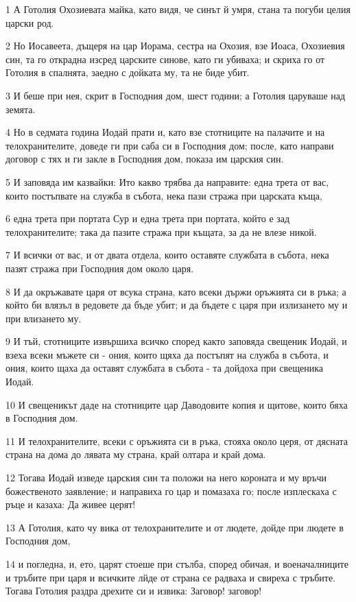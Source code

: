 \par 1 А Готолия Охозиевата майка, като видя, че синът й умря, стана та погуби целия царски род.
\par 2 Но Иосавеета, дъщеря на цар Иорама, сестра на Охозия, взе Иоаса, Охозиевия син, та го открадна изсред царските синове, като ги убиваха; и скриха го от Готолия в спалнята, заедно с дойката му, та не биде убит.
\par 3 И беше при нея, скрит в Господния дом, шест години; а Готолия царуваше над земята.
\par 4 Но в седмата година Иодай прати и, като взе стотниците на палачите и на телохранителите, доведе ги при саба си в Господния дом; после, като направи договор с тях и ги закле в Господния дом, показа им царския син.
\par 5 И заповяда им казвайки: Ито какво трябва да направите: една трета от вас, които постъпвате на служба в събота, нека пази стража при царската къща,
\par 6 една трета при портата Сур и една трета при портата, който е зад телохранителите; така да пазите стража при къщата, за да не влезе никой.
\par 7 И всички от вас, и от двата отдела, които оставяте службата в събота, нека пазят стража при Господния дом около царя.
\par 8 И да окръжавате царя от всука страна, като всеки държи оръжията си в ръка; а който би влязъл в редовете да бъде убит; и да бъдете с царя при излизането му и при влизането му.
\par 9 И тъй, стотниците извършиха всичко според както заповяда свещеник Иодай, и взеха всеки мъжете си - ония, които щяха да постъпят на служба в събота, и ония, които щаха да оставят службата в събота - та дойдоха при свещеника Иодай.
\par 10 И свещеникът даде на стотниците цар Даводовите копия и щитове, които бяха в Господния дом.
\par 11 И телохранителите, всеки с оръжията си в ръка, стояха около церя, от дясната страна на дома до лявата му страна, край олтара и край дома.
\par 12 Тогава Иодай изведе царския син та положи на него короната и му връчи божественото заявление; и направиха го цар и помазаха го; после изплескаха с ръце и казаха: Да живее церят!
\par 13 А Готолия, като чу вика от телохранителите и от людете, дойде при людете в Господния дом,
\par 14 и погледна, и, ето, царят стоеше при стълба, според обичая, и военачалниците и тръбите при царя и всичките лйде от страна се радваха и свиреха с тръбите. Тогава Готолия раздра дрехите си и извика: Заговор! заговор!
